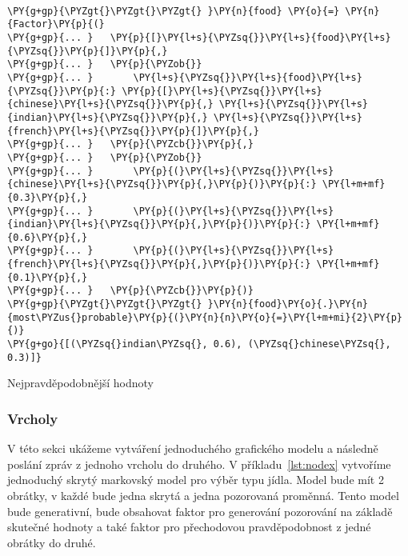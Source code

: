 \begin{example}
\begin{Verbatim}[commandchars=\\\{\}]

\PY{g+gp}{\PYZgt{}\PYZgt{}\PYZgt{} }\PY{n}{food} \PY{o}{=} \PY{n}{Factor}\PY{p}{(}
\PY{g+gp}{... }   \PY{p}{[}\PY{l+s}{\PYZsq{}}\PY{l+s}{food}\PY{l+s}{\PYZsq{}}\PY{p}{]}\PY{p}{,}
\PY{g+gp}{... }   \PY{p}{\PYZob{}}
\PY{g+gp}{... }       \PY{l+s}{\PYZsq{}}\PY{l+s}{food}\PY{l+s}{\PYZsq{}}\PY{p}{:} \PY{p}{[}\PY{l+s}{\PYZsq{}}\PY{l+s}{chinese}\PY{l+s}{\PYZsq{}}\PY{p}{,} \PY{l+s}{\PYZsq{}}\PY{l+s}{indian}\PY{l+s}{\PYZsq{}}\PY{p}{,} \PY{l+s}{\PYZsq{}}\PY{l+s}{french}\PY{l+s}{\PYZsq{}}\PY{p}{]}\PY{p}{,}
\PY{g+gp}{... }   \PY{p}{\PYZcb{}}\PY{p}{,}
\PY{g+gp}{... }   \PY{p}{\PYZob{}}
\PY{g+gp}{... }       \PY{p}{(}\PY{l+s}{\PYZsq{}}\PY{l+s}{chinese}\PY{l+s}{\PYZsq{}}\PY{p}{,}\PY{p}{)}\PY{p}{:} \PY{l+m+mf}{0.3}\PY{p}{,}
\PY{g+gp}{... }       \PY{p}{(}\PY{l+s}{\PYZsq{}}\PY{l+s}{indian}\PY{l+s}{\PYZsq{}}\PY{p}{,}\PY{p}{)}\PY{p}{:} \PY{l+m+mf}{0.6}\PY{p}{,}
\PY{g+gp}{... }       \PY{p}{(}\PY{l+s}{\PYZsq{}}\PY{l+s}{french}\PY{l+s}{\PYZsq{}}\PY{p}{,}\PY{p}{)}\PY{p}{:} \PY{l+m+mf}{0.1}\PY{p}{,}
\PY{g+gp}{... }   \PY{p}{\PYZcb{}}\PY{p}{)}
\PY{g+gp}{\PYZgt{}\PYZgt{}\PYZgt{} }\PY{n}{food}\PY{o}{.}\PY{n}{most\PYZus{}probable}\PY{p}{(}\PY{n}{n}\PY{o}{=}\PY{l+m+mi}{2}\PY{p}{)}
\PY{g+go}{[(\PYZsq{}indian\PYZsq{}, 0.6), (\PYZsq{}chinese\PYZsq{}, 0.3)]}
\end{Verbatim}
\caption{Nejpravděpodobnější hodnoty}
\label{lst:facmop}
\end{example}


\subsubsection{Vrcholy}

V této sekci ukážeme vytváření jednoduchého grafického modelu a následně poslání zpráv z jednoho vrcholu do druhého.
V příkladu~\ref{lst:nodex} vytvoříme jednoduchý skrytý markovský model pro výběr typu jídla.
Model bude mít 2 obrátky, v každé bude jedna skrytá a jedna pozorovaná proměnná.
Tento model bude generativní, bude obsahovat faktor pro generování pozorování na základě skutečné hodnoty a také faktor pro přechodovou pravděpodobnost z jedné obrátky do druhé.

